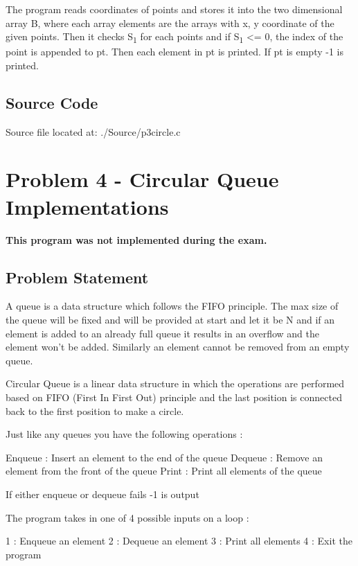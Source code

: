 \documentclass{article}
\begin{document}
The program reads coordinates of points and stores it into the two dimensional array B, where each array elements are the arrays with x, y coordinate of the given points. Then it checks S\textsubscript{1} for each points and if S\textsubscript{1} <= 0, the index of the point is appended to pt. Then each element in pt is printed. If pt is empty -1 is printed.
\subsection{Source Code}
Source file located at: ./Source/p3circle.c

\newpage
\section{Problem 4 - Circular Queue Implementations}
\textbf{This program was not implemented during the exam.}
\subsection{Problem Statement}
A queue is a data structure which follows the FIFO principle. The max size of the queue will be fixed and will be provided at start and let it be N and if an element is added to an already full queue it results in an overflow and the element won't be added. Similarly an element cannot be removed from an empty queue.

Circular Queue is a linear data structure in which the operations are performed based on FIFO (First In First Out) principle and the last position is connected back to the first position to make a circle.

Just like any queues you have the following operations :

    Enqueue : Insert an element to the end of the queue
    Dequeue : Remove an element from the front of the queue
    Print : Print all elements of the queue

If either enqueue or dequeue fails -1 is output

The program takes in one of 4 possible inputs on a loop :

    1 : Enqueue an element
    2 : Dequeue an element
    3 : Print all elements
    4 : Exit the program
    
\end{document}
